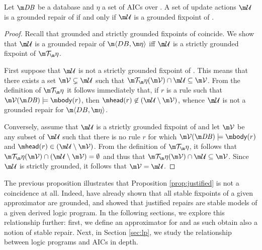 \begin{proposition}\label{prop:grounded:ok}
 Let $\db$ be a database and $\eta$ a set of AICs over \db. A set of update actions $\UU$ is a grounded repair of \fulldb if and only if $\UU$ is a grounded fixpoint of \Op. 
\end{proposition}
\begin{proof}
Recall that grounded and strictly grounded fixpoints of \Op coincide.
We show that $\UU$ is a grounded repair of $\fulldb$ iff $\UU$ is a strictly grounded fixpoint of $\Op$.

First suppose
that $\UU$ is not a strictly grounded fixpoint of \Op.
This means that there exists a set $\VV\subsetneq\UU$ such that $\Op(\VV)\cap\UU\subseteq\VV$.
From the definition of $\Op$ it follows immediately that, if $r$ is a rule such that $\VV(\db)\models\body(r)$, then $\head(r)\not\in(\UU\setminus\VV)$, whence $\UU$ is not a grounded repair for $\fulldb$.
 
Conversely, assume that $\UU$ is a strictly grounded fixpoint of \Op
and let $\VV$ be any subset of $\UU$ such that there is no rule $r$ for which $\VV(\db)\models\body(r)$ and $\head(r)\in(\UU\setminus\VV)$. From the definition of $\Op$, it follows that $\Op(\VV)\cap(\UU\setminus\VV)=\emptyset$ and thus that $\Op(\VV)\cap\UU\subseteq \VV$. Since $\UU$ is strictly grounded, it follows that $\VV=\UU$. 
\end{proof}

The previous proposition illustrates that Proposition \ref{prop:justified} is not a coincidence at all. 
Indeed,  have already shown that all stable fixpoints of a given approximator are grounded, and 
\citet[Theorem~6]{tplp/CaropreseT11} showed that justified repairs are stable models of a given derived logic program. 
In the following sections, we explore this relationship further: first, we define an approximator for \Op and as such obtain also a notion of stable repair. 
Next, in Section \ref{sec:lp}, we  study the relationship between logic programs and AICs in depth. 

